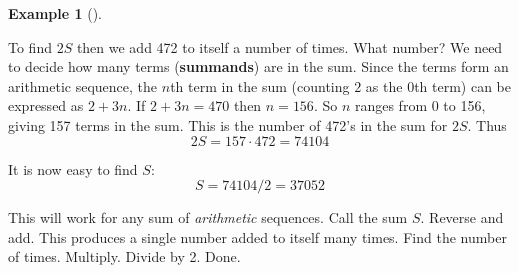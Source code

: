 \documentclass[10pt,]{book}
\newcommand{\terminology}[1]{\textbf{#1}}
\theoremstyle{plain}
\theoremstyle{definition}
\theoremstyle{definition}
\newtheorem{example}[theorem]{Example}
\theoremstyle{definition}
\theoremstyle{definition}
\numberwithin{equation}{chapter}
\begin{document}
\begin{example}[]
\hypertarget{p-143}{}%
To find \(2S\) then we add 472 to itself a number of times. What number? We need to decide how many terms (\terminology{summands}) are in the sum. Since the terms form an arithmetic sequence, the \(n\)th term in the sum (counting \(2\) as the 0th term) can be expressed as \(2 + 3n\). If \(2 + 3n = 470\) then \(n = 156\). So \(n\) ranges from 0 to 156, giving 157 terms in the sum. This is the number of 472's in the sum for \(2S\). Thus%
\begin{equation*}
2S = 157\cdot 472 = 74104
\end{equation*}
%
\par
\hypertarget{p-144}{}%
It is now easy to find \(S\):%
\begin{equation*}
S = 74104/2 = 37052
\end{equation*}
%
\end{example}
\hypertarget{p-145}{}%
This will work for any sum of \emph{arithmetic} sequences. Call the sum \(S\). Reverse and add. This produces a single number added to itself many times. Find the number of times. Multiply. Divide by 2. Done.%
\end{document}
